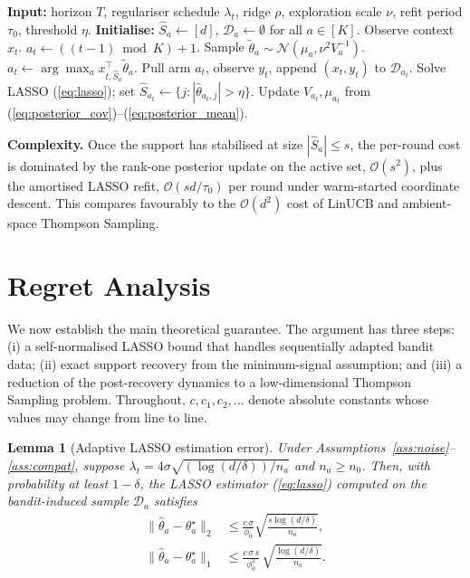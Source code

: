 \documentclass[journal,twoside,web]{ieeecolor}
\newtheorem{lemma}{Lemma}
\begin{document}
\begin{algorithm}[t]
\caption{FGTS-LASSO}\label{alg:fgts}
\begin{algorithmic}[1]
\STATE \textbf{Input:} horizon $T$, regulariser schedule $\lambda_t$, ridge $\rho$, exploration scale $\nu$, refit period $\tau_0$, threshold $\eta$.
\STATE \textbf{Initialise:} $\hat{S}_a \leftarrow [d]$, $\mathcal{D}_a \leftarrow \emptyset$ for all $a \in [K]$.
    \STATE Observe context $x_t$.
        \STATE $a_t \leftarrow ((t-1) \bmod K) + 1$.
    \ELSE
            \STATE Sample $\tilde{\theta}_a \sim \mathcal{N}(\mu_a, \nu^2 V_a^{-1})$.
        \ENDFOR
        \STATE $a_t \leftarrow \arg\max_a x_{t,\hat{S}_a}^\top \tilde{\theta}_a$.
    \ENDIF
    \STATE Pull arm $a_t$, observe $y_t$, append $(x_t, y_t)$ to $\mathcal{D}_{a_t}$.
        \STATE Solve LASSO (\ref{eq:lasso}); set $\hat{S}_{a_t} \leftarrow \{j: |\hat\theta_{a_t, j}| > \eta\}$.
    \ENDIF
    \STATE Update $V_{a_t}, \mu_{a_t}$ from (\ref{eq:posterior_cov})--(\ref{eq:posterior_mean}).
\ENDFOR
\end{algorithmic}
\end{algorithm}

\textbf{Complexity.} Once the support has stabilised at size $|\hat{S}_a| \leq s$, the per-round cost is dominated by the rank-one posterior update on the active set, $\mathcal{O}(s^2)$, plus the amortised LASSO refit, $\mathcal{O}(s d / \tau_0)$ per round under warm-started coordinate descent. This compares favourably to the $\mathcal{O}(d^2)$ cost of LinUCB and ambient-space Thompson Sampling.

\section{Regret Analysis}\label{sec:theory}

We now establish the main theoretical guarantee. The argument has three steps: (i) a self-normalised LASSO bound that handles sequentially adapted bandit data; (ii) exact support recovery from the minimum-signal assumption; and (iii) a reduction of the post-recovery dynamics to a low-dimensional Thompson Sampling problem. Throughout, $c, c_1, c_2, \dots$ denote absolute constants whose values may change from line to line.

\begin{lemma}[Adaptive LASSO estimation error]\label{lem:lasso}
Under Assumptions~\ref{ass:noise}--\ref{ass:compat}, suppose $\lambda_t = 4\sigma\sqrt{(\log(d/\delta))/n_a}$ and $n_a \geq n_0$. Then, with probability at least $1-\delta$, the LASSO estimator (\ref{eq:lasso}) computed on the bandit-induced sample $\mathcal{D}_a$ satisfies
\begin{align}
\|\hat{\theta}_a - \theta^{\star}_a\|_2 &\leq \frac{c\, \sigma}{\phi_0} \sqrt{\frac{s \log(d/\delta)}{n_a}}, \label{eq:l2_err}\\
\|\hat{\theta}_a - \theta^{\star}_a\|_1 &\leq \frac{c\, \sigma\, s}{\phi_0^2}\, \sqrt{\frac{\log(d/\delta)}{n_a}}. \label{eq:l1_err}
\end{align}
\end{lemma}
\end{document}
